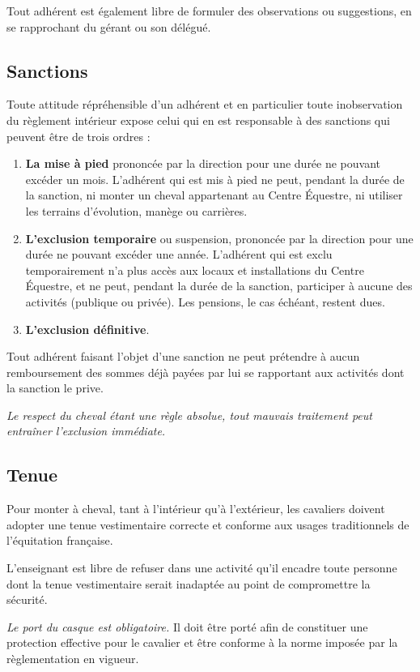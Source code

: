 \documentclass[11pt,a4paper]{article}
\begin{document}
   Tout adhérent est également libre de formuler des observations ou suggestions, en se rapprochant du gérant ou son délégué.

   \subsection{Sanctions}\label{subsec:sanctions}
   Toute attitude répréhensible d'un adhérent et en particulier toute inobservation du règlement intérieur expose celui qui en est responsable à des sanctions qui peuvent être de trois ordres :
   \begin{enumerate}
      \item \textbf{La mise à pied} prononcée par la direction pour une durée ne pouvant excéder un mois.
      L'adhérent qui est mis à pied ne peut, pendant la durée de la sanction, ni monter un cheval appartenant au Centre Équestre, ni utiliser les terrains d'évolution, manège ou carrières.
      \item \textbf{L'exclusion temporaire} ou suspension, prononcée par la direction pour une durée ne pouvant excéder une année.
      L'adhérent qui est exclu temporairement n'a plus accès aux locaux et installations du Centre Équestre, et ne peut, pendant la durée de la sanction, participer à aucune des activités (publique ou privée).
      Les pensions, le cas échéant, restent dues.
      \item \textbf{L'exclusion définitive}.
   \end{enumerate}
   Tout adhérent faisant l'objet d'une sanction ne peut prétendre à aucun remboursement des sommes déjà payées par lui se rapportant aux activités dont la sanction le prive.

   \emph{Le respect du cheval étant une règle absolue, tout mauvais traitement peut entraîner l'exclusion immédiate.}

   \subsection{Tenue}\label{subsec:tenue}
   Pour monter à cheval, tant à l'intérieur qu'à l'extérieur, les cavaliers doivent adopter une tenue vestimentaire correcte et conforme aux usages traditionnels de l'équitation française.

   L'enseignant est libre de refuser dans une activité qu'il encadre toute personne dont la tenue vestimentaire serait inadaptée au point de compromettre la sécurité.

   \emph{Le port du casque est obligatoire.}
   Il doit être porté afin de constituer une protection effective pour le cavalier et être conforme à la norme imposée par la règlementation en vigueur.
\end{document}
